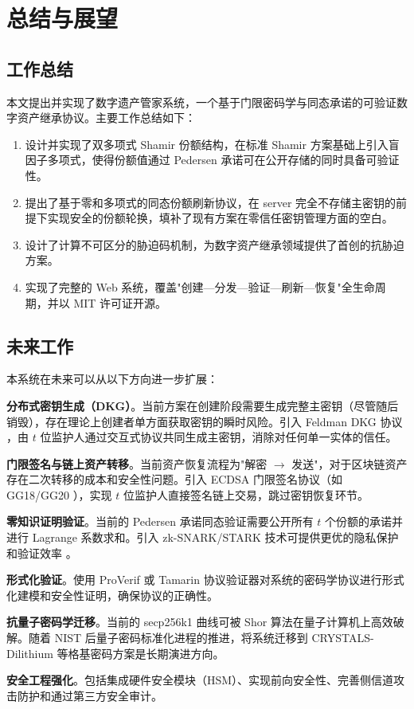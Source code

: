 \section{总结与展望}

\subsection{工作总结}

本文提出并实现了数字遗产管家系统，一个基于门限密码学与同态承诺的可验证数字资产继承协议。主要工作总结如下：

\begin{enumerate}[label=(\arabic*)]
    \item 设计并实现了双多项式 Shamir 份额结构，在标准 Shamir 方案基础上引入盲因子多项式，使得份额值通过 Pedersen 承诺可在公开存储的同时具备可验证性。
    \item 提出了基于零和多项式的同态份额刷新协议，在 server 完全不存储主密钥的前提下实现安全的份额轮换，填补了现有方案在零信任密钥管理方面的空白。
    \item 设计了计算不可区分的胁迫码机制，为数字资产继承领域提供了首创的抗胁迫方案。
    \item 实现了完整的 Web 系统，覆盖"创建—分发—验证—刷新—恢复"全生命周期，并以 MIT 许可证开源。
\end{enumerate}

\subsection{未来工作}

本系统在未来可以从以下方向进一步扩展：

\textbf{分布式密钥生成（DKG）}。当前方案在创建阶段需要生成完整主密钥（尽管随后销毁），存在理论上创建者单方面获取密钥的瞬时风险。引入 Feldman DKG 协议 \cite{feldman1987practical}，由 $t$ 位监护人通过交互式协议共同生成主密钥，消除对任何单一实体的信任。

\textbf{门限签名与链上资产转移}。当前资产恢复流程为"解密 $\rightarrow$ 发送"，对于区块链资产存在二次转移的成本和安全性问题。引入 ECDSA 门限签名协议（如 GG18/GG20 \cite{gennaro2016threshold}），实现 $t$ 位监护人直接签名链上交易，跳过密钥恢复环节。

\textbf{零知识证明验证}。当前的 Pedersen 承诺同态验证需要公开所有 $t$ 个份额的承诺并进行 Lagrange 系数求和。引入 zk-SNARK/STARK 技术可提供更优的隐私保护和验证效率 \cite{ben2020scalable}。

\textbf{形式化验证}。使用 ProVerif \cite{blanchet2001efficient} 或 Tamarin \cite{meier2013tamarin} 协议验证器对系统的密码学协议进行形式化建模和安全性证明，确保协议的正确性。

\textbf{抗量子密码学迁移}。当前的 secp256k1 曲线可被 Shor 算法在量子计算机上高效破解。随着 NIST 后量子密码标准化进程的推进，将系统迁移到 CRYSTALS-Dilithium \cite{lyubashevsky2022crystals} 等格基密码方案是长期演进方向。

\textbf{安全工程强化}。包括集成硬件安全模块（HSM）、实现前向安全性、完善侧信道攻击防护和通过第三方安全审计。


